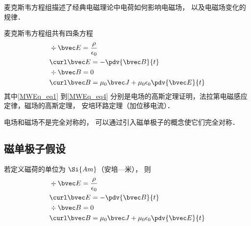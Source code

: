 
\begin{issues}
\issueDraft
\end{issues}

麦克斯韦方程组描述了经典电磁理论中电荷如何影响电磁场， 以及电磁场变化的规律．

麦克斯韦方程组共有四条方程
\begin{align}
\label{MWEq_eq1}
&\div \bvec E = \frac{\rho}{\epsilon_0}\\
\label{MWEq_eq2}
&\curl \bvec E = -\pdv{\bvec B}{t}\\
\label{MWEq_eq3}
&\div \bvec B = 0 \\
\label{MWEq_eq4}
&\curl \bvec B = \mu_0 \bvec J + \mu_0\epsilon_0 \pdv{\bvec E}{t}
\end{align}
其中\autoref{MWEq_eq1} 到\autoref{MWEq_eq4} 分别是电场的高斯定理证明，法拉第电磁感应定律，磁场的高斯定理， 安培环路定理（加位移电流）．%

电场和磁场不是完全对称的， 可以通过引入磁单极子的概念使它们完全对称．

\subsection{磁单极子假设}
若定义磁荷的单位为 $\Si{Am}$（安培—米）， 则
\begin{align}
&\div \bvec E = \frac{\rho}{\epsilon_0}\\
&\curl \bvec E = -\pdv{\bvec B}{t}\\
&\div \bvec B = 0 \\
&\curl \bvec B = \mu_0 \bvec J + \mu_0\epsilon_0 \pdv{\bvec E}{t}
\end{align}
